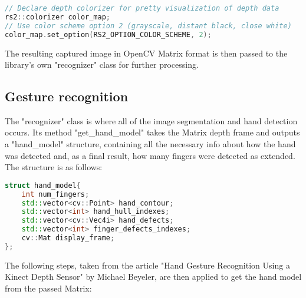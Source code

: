 \documentclass[BSA,Bachelor,english]{twbook}%
\begin{document}
\begin{lstlisting}[language=C++,name={RealSense image colorizer},label={rs:init:1}]
// Declare depth colorizer for pretty visualization of depth data
rs2::colorizer color_map;
// Use color scheme option 2 (grayscale, distant black, close white)
color_map.set_option(RS2_OPTION_COLOR_SCHEME, 2);
\end{lstlisting}

The resulting captured image in OpenCV Matrix format is then passed to the library's own "recognizer" class for further processing.

\subsection{Gesture recognition}

The "recognizer" class is where all of the image segmentation and hand detection occurs. Its method "get\_hand\_model" takes the Matrix depth frame and outputs a "hand\_model" structure, containing all the necessary info about how the hand was detected and, as a final result, how many fingers were detected as extended. The structure is as follows:

\begin{lstlisting}[language=C++,name={Hand Model Structure},label={rs:hand_model:1}]
struct hand_model{
	int num_fingers;
	std::vector<cv::Point> hand_contour;
	std::vector<int> hand_hull_indexes;
	std::vector<cv::Vec4i> hand_defects;
	std::vector<int> finger_defects_indexes;
	cv::Mat display_frame;
};
\end{lstlisting}

\newpage
The following steps, taken from the article "Hand Gesture Recognition Using a Kinect Depth Sensor" by Michael Beyeler\cite{RECOG_ARTICLE},  are then applied to get the hand model from the passed Matrix:
\end{document}
